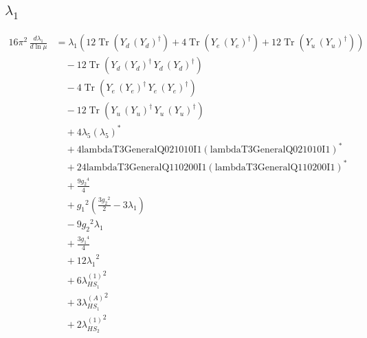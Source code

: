 \documentclass[10pt,a4paper]{article}
\begin{document}
\subsection*{$\lambda_1$}
\begin{align*}
16\pi^2\,\frac{d \lambda_1}{d\ln\mu} &={\lambda_1} (12 \operatorname{Tr}\!\left({Y_d}\,\left({Y_d}\right)^{\dagger}\right)+4 \operatorname{Tr}\!\left({Y_e}\,\left({Y_e}\right)^{\dagger}\right)+12 \operatorname{Tr}\!\left({Y_u}\,\left({Y_u}\right)^{\dagger}\right)) \\
&\quad -12 \operatorname{Tr}\!\left({Y_d}\,\left({Y_d}\right)^{\dagger}\,{Y_d}\,\left({Y_d}\right)^{\dagger}\right) \\
&\quad -4 \operatorname{Tr}\!\left({Y_e}\,\left({Y_e}\right)^{\dagger}\,{Y_e}\,\left({Y_e}\right)^{\dagger}\right) \\
&\quad -12 \operatorname{Tr}\!\left({Y_u}\,\left({Y_u}\right)^{\dagger}\,{Y_u}\,\left({Y_u}\right)^{\dagger}\right) \\
&\quad +4 {\lambda_5} \left({\lambda_5}\right)^{*} \\
&\quad +4 \text{lambdaT3GeneralQ021010I1} \left(\text{lambdaT3GeneralQ021010I1}\right)^{*} \\
&\quad +24 \text{lambdaT3GeneralQ110200I1} \left(\text{lambdaT3GeneralQ110200I1}\right)^{*} \\
&\quad +\frac{9 {g_2}^4}{4} \\
&\quad +{g_1}^2 \left(\frac{3 {g_2}^2}{2}-3 {\lambda_1}\right) \\
&\quad -9 {g_2}^2 {\lambda_1} \\
&\quad +\frac{3 {g_1}^4}{4} \\
&\quad +12 {\lambda_1}^2 \\
&\quad +6 {\lambda_{HS_1}^{(1)}}^2 \\
&\quad +3 {\lambda_{HS_1}^{(A)}}^2 \\
&\quad +2 {\lambda_{HS_2}^{(1)}}^2 \\
\end{align*}
\end{document}
